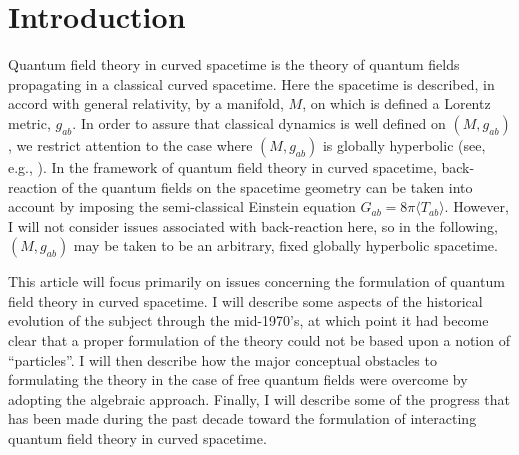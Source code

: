 \documentclass[12pt,epsf,amsfonts,amssymb]{article}
\begin{document}
\section{Introduction} 

Quantum field theory in curved spacetime is the theory of quantum
fields propagating in a classical curved spacetime. 
Here the spacetime
is described, in accord with general relativity, by a manifold, $M$,
on which is defined a Lorentz metric, $g_{ab}$. In order to assure
that classical dynamics is well defined on $(M, g_{ab})$, we restrict
attention to the case where $(M, g_{ab})$ is globally hyperbolic (see,
e.g., \cite{w1}). In the framework of quantum field theory in curved
spacetime, back-reaction of the quantum fields on the spacetime
geometry can be taken into account by imposing the semi-classical
Einstein equation $G_{ab} = 8 \pi \langle T_{ab} \rangle$. However, I will not
consider issues associated with back-reaction here, so in the
following, $(M, g_{ab})$ may be taken to be an arbitrary, fixed
globally hyperbolic spacetime.

This article will focus primarily on issues concerning the formulation
of quantum field theory in curved spacetime. I will describe some
aspects of the historical evolution of the subject through the
mid-1970's, at which point it had become clear that a proper
formulation of the theory could not be based upon a notion of
``particles''. I will then describe how the major conceptual obstacles
to formulating the theory in the case of free quantum fields were
overcome by adopting the algebraic approach. Finally, I will describe some
of the progress that has been made during the past decade toward the
formulation of interacting quantum field theory in curved spacetime.
\end{document}
